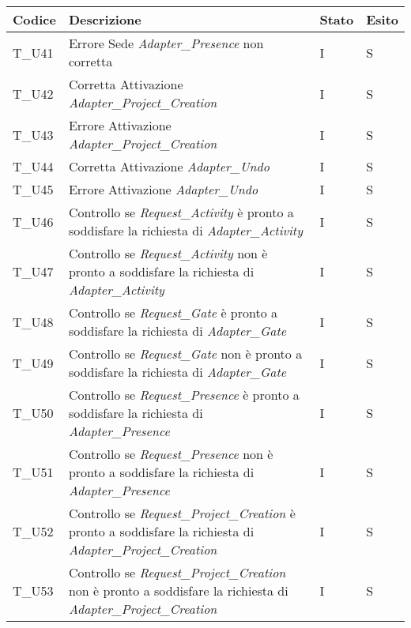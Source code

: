 \begin{center}
\begin{tabular}{ |m{3em}|m{23em}|m{3em}|m{3em}| }
      \hline
      \textbf{Codice} & \textbf{Descrizione}  & \textbf{Stato} & \textbf{Esito}\\
      \hline
      T\_U41 & Errore Sede \textit{Adapter\_Presence} non corretta  & I & S \\
      \hline 
      T\_U42 & Corretta Attivazione \textit{Adapter\_Project\_Creation } & I & S\\
      \hline
      T\_U43 & Errore Attivazione \textit{Adapter\_Project\_Creation } & I & S \\
      \hline
      T\_U44 & Corretta Attivazione \textit{Adapter\_Undo } & I & S \\
      \hline
      T\_U45 & Errore Attivazione \textit{Adapter\_Undo } & I & S\\
      \hline
      T\_U46 & Controllo se \textit{Request\_Activity} è pronto a soddisfare la richiesta di \textit{Adapter\_Activity}  & I & S \\
      \hline
      T\_U47 & Controllo se \textit{Request\_Activity} non è pronto a soddisfare la richiesta di \textit{Adapter\_Activity}  & I & S \\
      \hline
      T\_U48 & Controllo se \textit{Request\_Gate} è pronto a soddisfare la richiesta di \textit{Adapter\_Gate}  & I & S\\
      \hline
      T\_U49 & Controllo se \textit{Request\_Gate} non è pronto a soddisfare la richiesta di \textit{Adapter\_Gate}  & I & S \\
      \hline
      T\_U50 & Controllo se \textit{Request\_Presence} è pronto a soddisfare la richiesta di \textit{Adapter\_Presence}  & I & S\\
      \hline
      T\_U51 &Controllo se \textit{Request\_Presence} non è pronto a soddisfare la richiesta di \textit{Adapter\_Presence}  & I & S\\
      \hline
      T\_U52 & Controllo se \textit{Request\_Project\_Creation} è pronto a soddisfare la richiesta di \textit{Adapter\_Project\_Creation}  & I & S\\
      \hline
      T\_U53 & Controllo se \textit{Request\_Project\_Creation} non è pronto a soddisfare la richiesta di \textit{Adapter\_Project\_Creation}  & I & S \\
      \hline
\end{tabular}
\end{center}
\newpage
